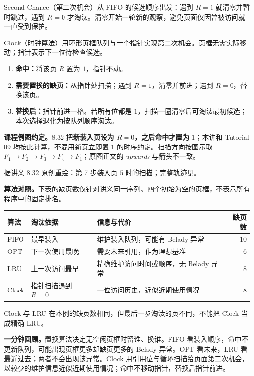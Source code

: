 Second-Chance（第二次机会）从 FIFO 的候选顺序出发：遇到 $R=1$ 就清零并暂时跳过，遇到 $R=0$ 才淘汰。清零开始一轮新的观察，避免页面仅因曾被访问就一直受到保护。

Clock（时钟算法）用环形页框队列与一个指针实现第二次机会。页框无需实际移动；指针表示下一位待检查候选。
\begin{enumerate}
  \item \textbf{命中：}将该页 $R$ 置为 $1$，指针不动。
  \item \textbf{需要置换的缺页：}从指针处扫描；遇到 $R=1$，清零并前进；遇到 $R=0$，替换该页。
  \item \textbf{替换后：}指针前进一格。若所有位都是 $1$，扫描一圈清零后可淘汰最初候选；本次选择退化为按队列顺序淘汰。
\end{enumerate}

\textbf{课程例图约定。}8.32 把\textbf{新装入页设为 $R=0$，之后命中才置为 $1$}；本讲和 Tutorial 09 均按此计算，不混用新页立即置 $1$ 的时序约定。扫描方向按图示取 $F_1\to F_2\to F_3\to F_4\to F_1$；原图正文的 \emph{upwards} 与箭头不一致。

\begin{center}


{\small 据讲义 8.32 原创重绘：第 7 步装入页 $5$ 时的扫描；完整轨迹见。}
\end{center}

\textbf{算法对照。}下表的缺页数仅针对讲义同一序列、四个初始为空的页框，不表示所有程序中的固定排名。
\begin{center}
\begin{tabularx}{\textwidth}{@{}l>{\raggedright\arraybackslash}X>{\raggedright\arraybackslash}Xr@{}}
\toprule
算法 & 淘汰依据 & 信息与代价 & 缺页数 \\
\midrule
FIFO & 最早装入 & 维护装入队列，可能有 Belady 异常 & 10 \\
OPT & 下一次使用最晚 & 需要未来引用，作为理想基准 & 6 \\
LRU & 上一次访问最早 & 精确维护访问时间或顺序，无 Belady 异常 & 8 \\
Clock & 指针扫描遇到 $R=0$ & 一位访问历史，近似近期使用情况 & 8 \\
\bottomrule
\end{tabularx}
\end{center}

Clock 与 LRU 在本例的缺页数相同，但最后一步淘汰的页不同，不能把 Clock 当成精确 LRU。

\textbf{一分钟回顾。}置换算法决定无空闲页框时留谁、换谁。FIFO 看装入顺序，命中不更新队列，可能出现页框更多却缺页更多的 Belady 异常。OPT 看未来，LRU 看最近过去；两者不会出现该异常。Clock 用引用位与循环扫描给页面第二次机会，以较少的维护信息近似近期使用情况；命中不移动指针，替换后指针前进。
\endgroup
